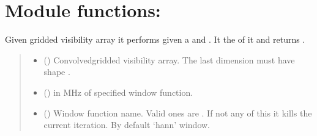 \documentclass[a4paper,11pt,oneside,english,openany]{sphinxmanual}
\begin{document}
\clearpage


\section{Module functions:}
\label{\detokenize{scf:module-functions}}

\begin{fulllineitems}
\label{\detokenize{scf:scf.doscf}}
\pysigstartsignatures
{}
\pysigstopsignatures
\sphinxAtStartPar
Given gridded visibility array it performs  given a  and . It  the  of it and returns .
\begin{quote}\begin{description}
\begin{itemize}
\item {} 
\sphinxAtStartPar
{} () \textendash{} Convolved\sphinxhyphen{}gridded visibility array. The last dimension must have shape .

\item {} 
\sphinxAtStartPar
{} () \textendash{}  in MHz of specified window function.

\item {} 
\sphinxAtStartPar
{} (\sphinxstyleliteralemphasis{\sphinxupquote{,}}\sphinxstyleliteralemphasis{\sphinxupquote{,}}\sphinxstyleliteralemphasis{\sphinxupquote{,}}\sphinxstyleliteralemphasis{\sphinxupquote{, }}) \textendash{} Window function name. Valid ones are . If not any of this it kills the current iteration. By default ‘hann’ window.


\end{itemize}
\end{description}
\end{quote}
\end{fulllineitems}
\end{document}
